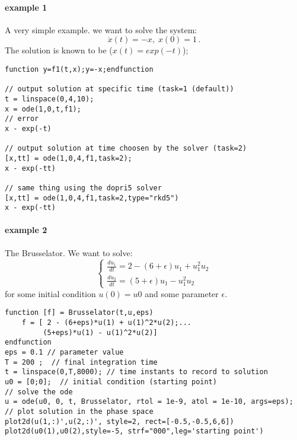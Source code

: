 \begin{examples}
  
\paragraph{example 1} A very simple example. we want to solve the system:
$$
  \dot{x}(t) = - x, \; x(0) = 1\,.
$$ 
The solution is known to be ($x(t) = exp(-t)$);
\begin{Verbatim}
function y=f1(t,x);y=-x;endfunction

// output solution at specific time (task=1 (default))
t = linspace(0,4,10);
x = ode(1,0,t,f1);
// error
x - exp(-t)

// output solution at time choosen by the solver (task=2)
[x,tt] = ode(1,0,4,f1,task=2);
x - exp(-tt)

// same thing using the dopri5 solver
[x,tt] = ode(1,0,4,f1,task=2,type="rkd5")
x - exp(-tt)
\end{Verbatim}
  
  
\paragraph{example 2} The Brusselator. We want to solve:
$$
\left\{
\begin{array}{l}
\frac{du_1}{dt} = 2 - (6 + \epsilon) u_1 + u_1^2 u_2 \\
\frac{du_2}{dt} = (5 + \epsilon) u_1 - u_1^2 u_2
\end{array}
\right.
$$
for some initial condition $u(0) = u0$ and some parameter $\epsilon$.
\begin{Verbatim}
function [f] = Brusselator(t,u,eps)
    f = [ 2 - (6+eps)*u(1) + u(1)^2*u(2);...
         (5+eps)*u(1) - u(1)^2*u(2)]
endfunction
eps = 0.1 // parameter value
T = 200 ;  // final integration time
t = linspace(0,T,8000); // time instants to record to solution
u0 = [0;0];  // initial condition (starting point)
// solve the ode
u = ode(u0, 0, t, Brusselator, rtol = 1e-9, atol = 1e-10, args=eps);
// plot solution in the phase space
plot2d(u(1,:)',u(2,:)', style=2, rect=[-0.5,-0.5,6,6])
plot2d(u0(1),u0(2),style=-5, strf="000",leg='starting point')
\end{Verbatim}
  
  

\end{examples}
